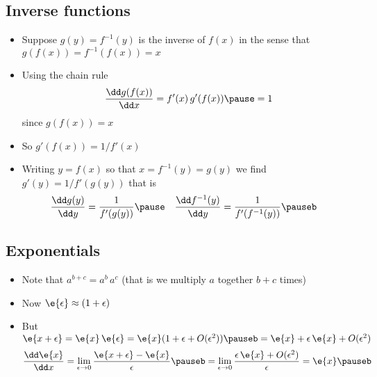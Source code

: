 
\begin{slide}
\section[-2]{Inverse functions}

\begin{PauseHighLight}
  \begin{itemize}
  \item Suppose $g(y) = f^{-1}(y)$ is the inverse of $f(x)$ in the sense that
    $g(f(x)) = f^{-1}(f(x))=x$\pause
  \item Using the chain rule
    \begin{align*}
      \frac{\dd g(f(x))}{\dd x} = f'(x)\, g'(f(x))\pause = 1
    \end{align*}
    since $g(f(x))= x$\pauseb
  \item  So $g'(f(x))= 1/f'(x)$\pause
   \item Writing $y=f(x)$ so that $x=f^{-1}(y) = g(y)$ we find $g'(y)
     = 1/f'(g(y))$ that is
     \begin{align*}
       \frac{\dd g(y)}{\dd y} &= \frac{1}{f'(g(y))}\pause &
       \frac{\dd f^{-1}(y)}{\dd y} &= \frac{1}{f'(f^{-1}(y))}\pauseb                            
     \end{align*}
  \end{itemize}
\end{PauseHighLight}


\end{slide}




\begin{slide}
  \section{Exponentials}

\begin{PauseHighLight}
  \begin{itemize}
  \item Note that $a^{b+c} = a^b \, a^c$ (that is we multiply $a$
    together $b+c$ times)\pauseb
  \item Now $\e{\epsilon} \approx (1+\epsilon) $\hfil\hfil {}\pauseb
  \item But $\e{x+\epsilon} = \e{x}\,\e{\epsilon} = \e{x}(1+\epsilon +
    O(\epsilon^2))\pauseb = \e{x} + \epsilon\,\e{x}+ O(\epsilon^2)$\pauseb
    \begin{align*}
      \frac{\dd \e{x}}{\dd x} = \lim_{\epsilon\rightarrow 0}
      \frac{\e{x+\epsilon}-\e{x}}{\epsilon}\pauseb
      =  \lim_{\epsilon\rightarrow 0} \frac{\epsilon\,\e{x} +
      O(\epsilon^2)}{\epsilon} = \e{x}\pauseb
    \end{align*}
  \end{itemize}
\end{PauseHighLight}

\end{slide}

